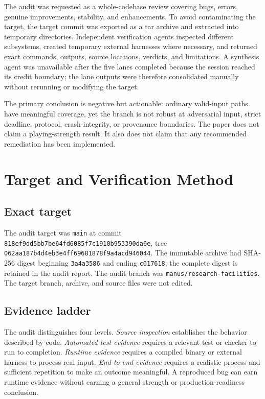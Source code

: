 \documentclass[conference]{IEEEtran}
\newcommand{\code}[1]{\texttt{\small #1}}
\begin{document}
The audit was requested as a whole-codebase review covering bugs, errors, genuine improvements, stability, and enhancements. To avoid contaminating the target, the target commit was exported as a tar archive and extracted into temporary directories. Independent verification agents inspected different subsystems, created temporary external harnesses where necessary, and returned exact commands, outputs, source locations, verdicts, and limitations. A synthesis agent was unavailable after the five lanes completed because the session reached its credit boundary; the lane outputs were therefore consolidated manually without rerunning or modifying the target.

The primary conclusion is negative but actionable: ordinary valid-input paths have meaningful coverage, yet the branch is not robust at adversarial input, strict deadline, protocol, crash-integrity, or provenance boundaries. The paper does not claim a playing-strength result. It also does not claim that any recommended remediation has been implemented.

\section{Target and Verification Method}
\subsection{Exact target}
The audit target was \code{main} at commit \code{818ef9dd5bb7be64fd6085f7c1910b953390da6e}, tree \code{062aa187b4d4eb3e4ff69681878f9a4acd946044}. The immutable archive had SHA-256 digest beginning \code{3a4a3586} and ending \code{c017618}; the complete digest is retained in the audit report. The audit branch was \code{manus/research-facilities}. The target branch, archive, and source files were not edited.

\subsection{Evidence ladder}
The audit distinguishes four levels. \emph{Source inspection} establishes the behavior described by code. \emph{Automated test evidence} requires a relevant test or checker to run to completion. \emph{Runtime evidence} requires a compiled binary or external harness to process real input. \emph{End-to-end evidence} requires a realistic process and sufficient repetition to make an outcome meaningful. A reproduced bug can earn runtime evidence without earning a general strength or production-readiness conclusion.
\end{document}
